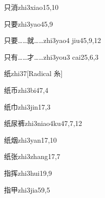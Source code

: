\begin{verbete}{只消}{zhi3xiao1}{5,10}
\end{verbete}

\begin{verbete}{只要}{zhi3yao4}{5,9}
\end{verbete}

\begin{verbete}{只要……就……}{zhi3yao4 jiu4}{5,9,12}
\end{verbete}

\begin{verbete}{只有……才……}{zhi3you3 cai2}{5,6,3}
\end{verbete}

\begin{verbete}{纸}{zhi3}{7}[Radical 糸]
\end{verbete}

\begin{verbete}{纸币}{zhi3bi4}{7,4}
\end{verbete}

\begin{verbete}{纸巾}{zhi3jin1}{7,3}
\end{verbete}

\begin{verbete}{纸尿裤}{zhi3niao4ku4}{7,7,12}
\end{verbete}

\begin{verbete}{纸烟}{zhi3yan1}{7,10}
\end{verbete}

\begin{verbete}{纸张}{zhi3zhang1}{7,7}
\end{verbete}

\begin{verbete}{指挥}{zhi3hui1}{9,9}
\end{verbete}

\begin{verbete}{指甲}{zhi3jia5}{9,5}
\end{verbete}


